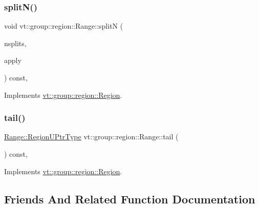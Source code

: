 \subsubsection{\texorpdfstring{split\+N()}{splitN()}}
{\footnotesize\ttfamily void vt\+::group\+::region\+::\+Range\+::splitN (\begin{DoxyParamCaption}\item[{int}]{nsplits,  }\item[{\hyperlink{structvt_1_1group_1_1region_1_1_region_a7c9e99b1157d2fe2f3e6fc36a1463a96}{Apply\+Fn\+Type}}]{apply }\end{DoxyParamCaption}) const\hspace{0.3cm}{\ttfamily [override]}, {\ttfamily [virtual]}}



Implements \hyperlink{structvt_1_1group_1_1region_1_1_region_ae8660d4218b57e91664dedfa807cd936}{vt\+::group\+::region\+::\+Region}.

\mbox{\label{structvt_1_1group_1_1region_1_1_range_a409f171c688707fa71e4aea1099ce691}} 
\subsubsection{\texorpdfstring{tail()}{tail()}}
{\footnotesize\ttfamily \hyperlink{structvt_1_1group_1_1region_1_1_region_ae5f42cf159116a3cf8bd65423eb01037}{Range\+::\+Region\+U\+Ptr\+Type} vt\+::group\+::region\+::\+Range\+::tail (\begin{DoxyParamCaption}{ }\end{DoxyParamCaption}) const\hspace{0.3cm}{\ttfamily [override]}, {\ttfamily [virtual]}}



Implements \hyperlink{structvt_1_1group_1_1region_1_1_region_a7d5bc5711c1b7954e27defa4dc94af40}{vt\+::group\+::region\+::\+Region}.



\subsection{Friends And Related Function Documentation}
\mbox{\label{structvt_1_1group_1_1region_1_1_range_a2a3990246b3bab9c29636b30aa9741ac}} 
